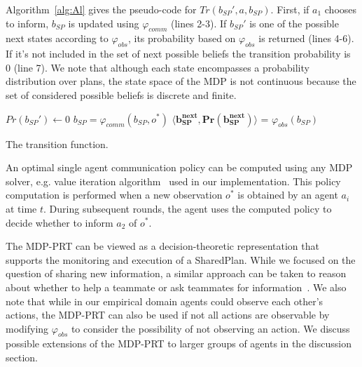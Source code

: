 Algorithm~\ref{alg:Al} gives the pseudo-code for $Tr({b_{SP}}',a,b_{SP})$. First, if $a_1$ chooses to inform, $b_{SP}$ is updated using $\varphi_{comm}$ (lines 2-3). If  ${b_{SP}}'$ is one of the possible next states according to $\varphi_{obs}$, its probability based on $\varphi_{obs}$ is returned (lines 4-6). If it's not included in the set of next possible beliefs the transition probability is 0 (line 7). 
We note that although each state encompasses a probability distribution over plans, the state space of the MDP is not continuous because the set of considered possible beliefs is discrete and finite. 



\begin{algorithm}
\DontPrintSemicolon %
$Pr({b_{SP}}') \gets 0$\;
 {
	$b_{SP} = \varphi_{comm}(b_{SP},o^*)$
}
$ \mathbf{\langle b_{SP}^{next}, Pr(b_{SP}^{next})\rangle}$ = $\varphi_{obs}(b_{SP})$\;
{
}
\;
\caption{The transition function. }
\label{alg:Al}
\end{algorithm}




 An optimal single agent communication policy can be computed using any MDP solver, e.g. value iteration algorithm~\cite{sondik1971optimal} used in our implementation. This policy computation is performed when a new observation $o^*$ is obtained by an agent $a_i$ at time $t$. During subsequent rounds, the agent uses the computed policy to decide whether to inform $a_2$ of $o^*$. 
 
 The MDP-PRT can be viewed as a decision-theoretic representation that supports the monitoring and execution of a SharedPlan. While we focused on the question of sharing new information, a similar approach can be taken to reason about whether to help a teammate or ask teammates for information~\cite{kamar2009incorporating}.  We also note that while in our empirical domain agents could observe each other's actions, the MDP-PRT can also be used if not all actions are observable by modifying $\varphi_{obs}$ to consider the possibility of not observing an action.
   We discuss possible extensions of the MDP-PRT to larger groups of agents in the discussion section.  
 

